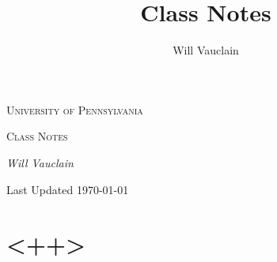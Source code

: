 \documentclass[openany]{book}
\title{\classname Class Notes}
\author{Will Vauclain}
\newcommand{\classname}{<++>}
\begin{document}
\begin{titlepage}
    \centering
    \vspace*{6cm}

    {\scshape\LARGE University of Pennsylvania \par}
    \vspace{1cm}
    {\huge\scshape \classname{} Class Notes\par}
    \vspace{1cm}
    {\Large\itshape Will Vauclain\par}

    \vfill

    {\large Last Updated \today\par}
\end{titlepage}

\tableofcontents

\chapter{<++>}
\end{document}
